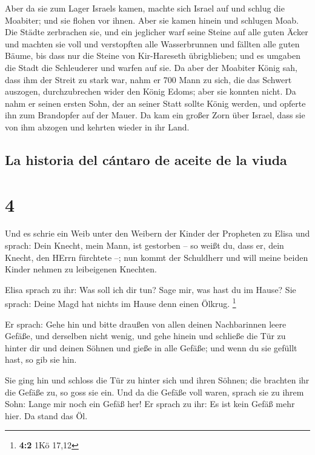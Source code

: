  Aber da sie zum Lager Israels kamen, machte sich Israel
auf und schlug die Moabiter; und sie flohen vor ihnen. Aber sie kamen
hinein und schlugen Moab.  Die Städte zerbrachen sie, und
ein jeglicher warf seine Steine auf alle guten Äcker und machten sie
voll und verstopften alle Wasserbrunnen und fällten alle guten Bäume,
bis dass nur die Steine von Kir-Hareseth übrigblieben; und es umgaben
die Stadt die Schleuderer und warfen auf sie.  Da aber
der Moabiter König sah, dass ihm der Streit zu stark war, nahm er 700
Mann zu sich, die das Schwert auszogen, durchzubrechen wider den König
Edoms; aber sie konnten nicht.  Da nahm er seinen ersten
Sohn, der an seiner Statt sollte König werden, und opferte ihn zum
Brandopfer auf der Mauer. Da kam ein großer Zorn über Israel, dass sie
von ihm abzogen und kehrten wieder in ihr Land.

\hypertarget{la-historia-del-cuxe1ntaro-de-aceite-de-la-viuda}{%
\subsection{La historia del cántaro de aceite de la
viuda}\label{la-historia-del-cuxe1ntaro-de-aceite-de-la-viuda}}

\hypertarget{section-3}{%
\section{4}\label{section-3}}

 Und es schrie ein Weib unter den Weibern der Kinder der
Propheten zu Elisa und sprach: Dein Knecht, mein Mann, ist gestorben --
so weißt du, dass er, dein Knecht, den HErrn fürchtete --; nun kommt der
Schuldherr und will meine beiden Kinder nehmen zu leibeigenen Knechten.

 Elisa sprach zu ihr: Was soll ich dir tun? Sage mir, was
hast du im Hause? Sie sprach: Deine Magd hat nichts im Hause denn einen
Ölkrug. \footnote{\textbf{4:2} 1Kö 17,12}

 Er sprach: Gehe hin und bitte draußen von allen deinen
Nachbarinnen leere Gefäße, und derselben nicht wenig,  und
gehe hinein und schließe die Tür zu hinter dir und deinen Söhnen und
gieße in alle Gefäße; und wenn du sie gefüllt hast, so gib sie hin.

 Sie ging hin und schloss die Tür zu hinter sich und ihren
Söhnen; die brachten ihr die Gefäße zu, so goss sie ein. 
Und da die Gefäße voll waren, sprach sie zu ihrem Sohn: Lange mir noch
ein Gefäß her! Er sprach zu ihr: Es ist kein Gefäß mehr hier. Da stand
das Öl.

